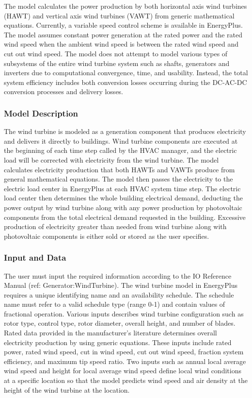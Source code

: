 The model calculates the power production by both horizontal axis wind turbines (HAWT) and vertical axis wind turbines (VAWT) from generic mathematical equations. Currently, a variable speed control scheme is available in EnergyPlus. The model assumes constant power generation at the rated power and the rated wind speed when the ambient wind speed is between the rated wind speed and cut out wind speed. The model does not attempt to model various types of subsystems of the entire wind turbine system such as shafts, generators and inverters due to computational convergence, time, and usability. Instead, the total system efficiency includes both conversion losses occurring during the DC-AC-DC conversion processes and delivery losses.

\subsubsection{Model Description}\label{model-description-010}

The wind turbine is modeled as a generation component that produces electricity and delivers it directly to buildings. Wind turbine components are executed at the beginning of each time step called by the HVAC manager, and the electric load will be corrected with electricity from the wind turbine. The model calculates electricity production that both HAWTs and VAWTs produce from general mathematical equations. The model then passes the electricity to the electric load center in EnergyPlus at each HVAC system time step. The electric load center then determines the whole building electrical demand, deducting the power output by wind turbine along with any power production by photovoltaic components from the total electrical demand requested in the building. Excessive production of electricity greater than needed from wind turbine along with photovoltaic components is either sold or stored as the user specifies.

\subsubsection{Input and Data}\label{input-and-data}

The user must input the required information according to the IO Reference Manual (ref: Generator:WindTurbine). The wind turbine model in EnergyPlus requires a unique identifying name and an availability schedule. The schedule name must refer to a valid schedule type (range 0-1) and contain values of fractional operation. Various inputs describes wind turbine configuration such as rotor type, control type, rotor diameter, overall height, and number of blades. Rated data provided in the manufacturer's literature determines overall electricity production by using generic equations. These inputs include rated power, rated wind speed, cut in wind speed, cut out wind speed, fraction system efficiency, and maximum tip speed ratio. Two inputs such as annual local average wind speed and height for local average wind speed define local wind conditions at a specific location so that the model predicts wind speed and air density at the height of the wind turbine at the location.

